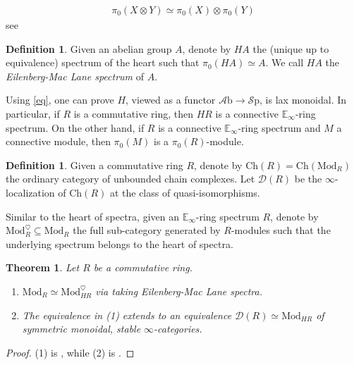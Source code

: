 \documentclass[10pt]{amsart}
\newcommand{\D}{\mathscr{D}}
\newcommand{\bE}{\mathbb{E}}
\newcommand{\Sp}{\mathscr{S}\mathrm{p}}
\newcommand{\Ch}{\mathrm{Ch}}
\newcommand{\Mod}{\mathrm{Mod}}
\newcommand{\Ab}{\mathscr{A}\mathrm{b}}
\newtheorem{theorem}[equation]{Theorem}
\theoremstyle{definition}
\newtheorem{definition}[equation]{Definition}
\theoremstyle{remark}
\begin{document}
\begin{align}\label{eq}
  \pi_0(X\otimes Y)\simeq\pi_0(X)\otimes\pi_0(Y)
\end{align}
see \cite[Theorem 2.3.28]{davies2024atii}

\begin{definition}Given an abelian group $A$, denote by $HA$ the (unique up to equivalence) spectrum of the heart such that $\pi_0(HA)\simeq A$. We call $HA$ the \emph{Eilenberg-Mac Lane spectrum} of $A$.
\end{definition}
Using \cref{eq}, one can prove $H$, viewed as a functor $\Ab\to\Sp$, is lax monoidal. In particular, if $R$ is a commutative ring, then $HR$ is a connective $\bE_\infty$-ring spectrum. On the other hand, if $R$ is a connective $\bE_\infty$-ring spectrum and $M$ a connective module, then $\pi_0(M)$ is a $\pi_0(R)$-module. 
\begin{definition}
  Given a commutative ring $R$, denote by $\Ch(R)=\Ch(\Mod_{R})$ the ordinary category of unbounded chain complexes. Let $\D(R)$ be the $\infty$-localization of $\Ch(R)$ at the class of quasi-isomorphisms.  
\end{definition} 
Similar to the heart of spectra, given an $\bE_\infty$-ring spectrum $R$, denote by $\Mod_{R}^\heartsuit\subseteq \Mod_{R}$ the full sub-category generated by $R$-modules such that the underlying spectrum belongs to the heart of spectra. 
\begin{theorem}\label{stable}
  Let $R$ be a commutative ring. 
  \begin{enumerate}
    \item $\Mod_{R}\simeq \Mod_{HR}^\heartsuit$ via taking Eilenberg-Mac Lane spectra.
    \item The equivalence in (1) extends to an equivalence $\D(R)\simeq \Mod_{HR}$ of symmetric monoidal, stable $\infty$-categories.
  \end{enumerate} 
\end{theorem}

\begin{proof}
  (1) is \cite[Proposition 7.1.1.13]{lurie2017ha}, while (2) is \cite[Theorem 7.1.2.13]{lurie2017ha}.
\end{proof}

\end{document}
